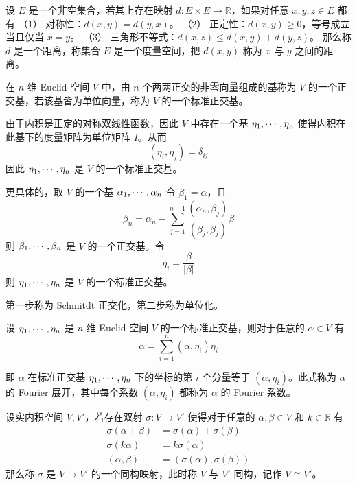 \begin{definition}
	设 $E$ 是一个非空集合，若其上存在映射 $d : E \times E \to \mathbb{R}$，如果对任意 $x,y,z\in E$ 都有
	（1） 对称性：$d(x,y) = d(y,x)$。
	（2） 正定性：$d(x,y) \geqslant $0，等号成立当且仅当 $x = y$。
	（3） 三角形不等式：$d(x,z) \leqslant d(x,y) + d(y,z)$。
	那么称 $d$ 是一个距离，称集合 $E$ 是一个度量空间，把 $d(x,y)$ 称为 $x$ 与 $y$ 之间的距离。
\end{definition}

\begin{definition}
	在 $n$ 维 Euclid 空间 $V$ 中，由 $n$ 个两两正交的非零向量组成的基称为 $V$ 的一个正交基，若该基皆为单位向量，称为 $V$ 的一个标准正交基。
\end{definition}

由于内积是正定的对称双线性函数，因此 $V$ 中存在一个基 $\eta_1,\cdots,\eta_n$ 使得内积在此基下的度量矩阵为单位矩阵 $I$。从而
\[ (\eta_i,\eta_j) = \delta_{ij} \]
因此 $\eta_1,\cdots,\eta_n$ 是 $V$ 的一个标准正交基。

更具体的，取 $V$ 的一个基 $\alpha_1,\cdots,\alpha_n$ 令 $\beta_1 = \alpha$，且
\[ \beta_n = \alpha_n - \sum_{j=1}^{n-1} \frac{(\alpha_n,\beta_j)}{(\beta_j,\beta_j)} \beta \]
则 $\beta_1,\cdots,\beta_n$ 是 $V$ 的一个正交基。令
\[ \eta_i = \frac{\beta}{|\beta|} \]
则 $\eta_1,\cdots,\eta_n$ 是 $V$ 的一个标准正交基。

第一步称为 Schmitdt 正交化，第二步称为单位化。

\begin{theorem}
	设 $\eta_1,\cdots,\eta_n$ 是 $n$ 维 Euclid 空间 $V$ 的一个标准正交基，则对于任意的 $\alpha \in V$ 有
	\[ \alpha = \sum_{i=1}^n (\alpha,\eta_i)\eta_i \]
\end{theorem}

即 $\alpha$ 在标准正交基 $\eta_1,\cdots,\eta_n$ 下的坐标的第 $i$ 个分量等于 $(\alpha,\eta_i)$。此式称为 $\alpha$ 的 Fourier 展开，其中每个系数 $(\alpha,\eta_i)$ 都称为 $\alpha$ 的 Fourier 系数。

\begin{definition}
	设实内积空间 $V,V'$，若存在双射 $\sigma : V \to V'$ 使得对于任意的 $\alpha,\beta \in V$ 和 $k \in \mathbb{R}$ 有
	\[
		\begin{aligned}
			\sigma(\alpha + \beta) & = \sigma(\alpha) + \sigma(\beta)  \\
			\sigma(k\alpha)        & = k\sigma(\alpha)                 \\
			(\alpha,\beta)         & = (\sigma(\alpha),\sigma(\beta))
		\end{aligned}
	\]
	那么称 $\sigma$ 是 $V \to V'$ 的一个同构映射，此时称 $V$ 与 $V'$ 同构，记作 $V \cong V'$。
\end{definition}

